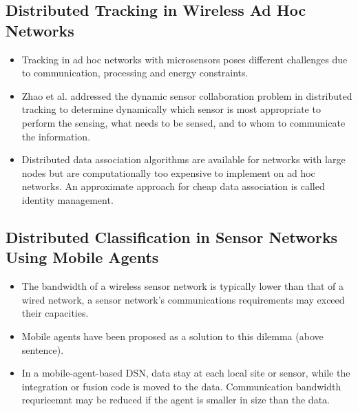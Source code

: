 \documentclass[letterpaper,10pt]{article}
\begin{document}
\subsection{Distributed Tracking in Wireless Ad Hoc Networks}

\begin{itemize}
	\item Tracking in ad hoc networks with microsensors poses different challenges due to communication, processing and energy constraints.
	\item Zhao et al. addressed the dynamic sensor collaboration problem in distributed tracking to determine dynamically which sensor is most appropriate to perform the sensing, what needs to be sensed, and to whom to communicate the information.
	\item Distributed data association algorithms are available for networks with large nodes but are computationally too expensive to implement on ad hoc networks. An approximate approach for cheap data association is called identity management.
\end{itemize}

\subsection{Distributed Classification in Sensor Networks Using Mobile Agents}

\begin{itemize}
	\item The bandwidth of a wireless sensor network is typically lower than that of a wired network, a sensor network's communications requirements may exceed their capacities.
	\item Mobile agents have been proposed as a solution to this dilemma (above sentence).
	\item In a mobile-agent-based DSN, data stay at each local site or sensor, while the integration or fusion code is moved to the data. Communication bandwidth requrieemnt may be reduced if the agent is smaller in size than the data.
\end{itemize}
\end{document}
